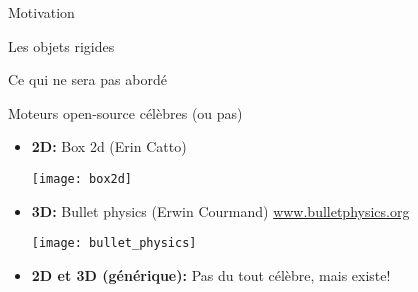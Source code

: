 \begin{frame}{Motivation}
\end{frame}

\begin{frame}{Les objets rigides}
\end{frame}

\begin{frame}{Ce qui ne sera pas abordé}
    \begin{figure}[h]
        \setcounter{subfigure}{0}
        \pause
        \pause
    \end{figure}
\end{frame}

\begin{frame}{Moteurs open-source célèbres (ou pas)}
    \begin{itemize}
        \item \textbf{2D:} Box 2d (Erin Catto)
            \begin{center}
                \texttt{[image: box2d]}
            \end{center}
        \item \textbf{3D:} Bullet physics (Erwin Courmand)
            \href{http://www.bulletphysics.org/Bullet/phpBB3/}{www.bulletphysics.org}
            \begin{center}
                \texttt{[image: bullet\_physics]}
            \end{center}
            \pause
        \item \textbf{2D et 3D (générique):} Pas du tout célèbre, mais existe!
    \end{itemize}
\end{frame}
